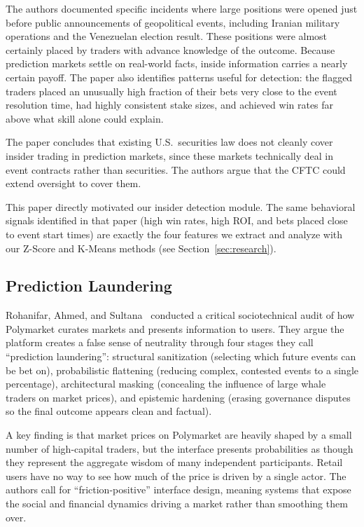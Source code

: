 \documentclass[sigconf,nonacm]{acmart}
\begin{document}
The authors documented specific incidents where large positions were
opened just before public announcements of geopolitical events,
including Iranian military operations and the Venezuelan election
result. These positions were almost certainly placed by traders with
advance knowledge of the outcome. Because prediction markets settle
on real-world facts, inside information carries a nearly certain
payoff. The paper also identifies patterns useful for detection: the
flagged traders placed an unusually high fraction of their bets very
close to the event resolution time, had highly consistent stake sizes,
and achieved win rates far above what skill alone could explain.

The paper concludes that existing U.S.\ securities law does not cleanly
cover insider trading in prediction markets, since these markets
technically deal in event contracts rather than securities. The authors
argue that the CFTC could extend oversight to cover them.

This paper directly motivated our insider detection module. The same
behavioral signals identified in that paper (high win rates, high ROI,
and bets placed close to event start times) are exactly the four
features we extract and analyze with our Z-Score and K-Means methods
(see Section~\ref{sec:research}).

\subsection{Prediction Laundering}

Rohanifar, Ahmed, and Sultana~\cite{rohanifar2025laundering} conducted
a critical sociotechnical audit of how Polymarket curates markets and
presents information to users. They argue the platform creates a false
sense of neutrality through four stages they call ``prediction
laundering'': structural sanitization (selecting which future events
can be bet on), probabilistic flattening (reducing complex, contested
events to a single percentage), architectural masking (concealing the
influence of large whale traders on market prices), and epistemic
hardening (erasing governance disputes so the final outcome appears
clean and factual).

A key finding is that market prices on Polymarket are heavily shaped
by a small number of high-capital traders, but the interface presents
probabilities as though they represent the aggregate wisdom of many
independent participants. Retail users have no way to see how much
of the price is driven by a single actor. The authors call for
``friction-positive'' interface design, meaning systems that expose
the social and financial dynamics driving a market rather than smoothing
them over.
\end{document}
